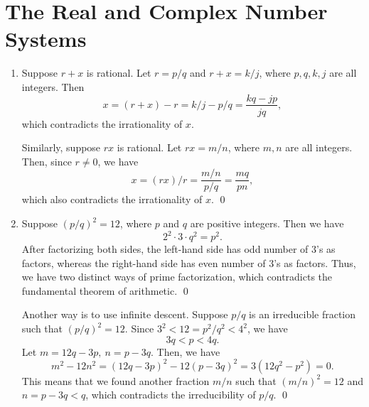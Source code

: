 
\chapter{The Real and Complex Number Systems}
\label{ch:01}

\begin{enumerate}
\item Suppose \(r+x\) is rational.  Let \(r = p/q\) and \(r+x = k/j\), where \(p,q,k,j\) are all integers.  Then
  \begin{equation*}
    x = (r+x) - r = k/j - p/q = \frac{kq - jp}{jq},
  \end{equation*}
  which contradicts the irrationality of \(x\).

  Similarly, suppose \(rx\) is rational.  Let \(rx = m/n\), where \(m,n\) are all integers.  Then, since \(r \ne 0\), we have
  \begin{equation*}
    x = (rx)/r = \frac{m/n}{p/q} = \frac{mq}{pn},
  \end{equation*}
  which also contradicts the irrationality of \(x\).
  \qed

\item Suppose \((p/q)^2 = 12\), where \(p\) and \(q\) are positive integers.  Then we have
  \begin{equation*}
    2^2 \cdot 3 \cdot q^2 = p^2.
  \end{equation*}
  After factorizing both sides, the left-hand side has odd number of \(3\)'s as factors, whereas the right-hand side has even number of \(3\)'s as factors.  Thus, we have two distinct ways of prime factorization, which contradicts the fundamental theorem of arithmetic.
  \qed

  Another way is to use infinite descent.  Suppose \(p/q\) is an irreducible fraction such that \((p/q)^2 = 12\).  Since \(3^2 < 12 = p^2/q^2 < 4^2\), we have
  \begin{equation*}
    3q < p < 4q.
  \end{equation*}
  Let \(m = 12q - 3p,\ n = p - 3q\).  Then, we have
  \begin{equation*}
    m^2 - 12n^2
    = (12q - 3p)^2 - 12(p - 3q)^2
    = 3(12q^2 - p^2)
    = 0.
  \end{equation*}
  This means that we found another fraction \(m/n\) such that \((m/n)^2 = 12\) and \(n = p - 3q < q\), which contradicts the irreducibility of \(p/q\).
  \qed


\end{enumerate}
